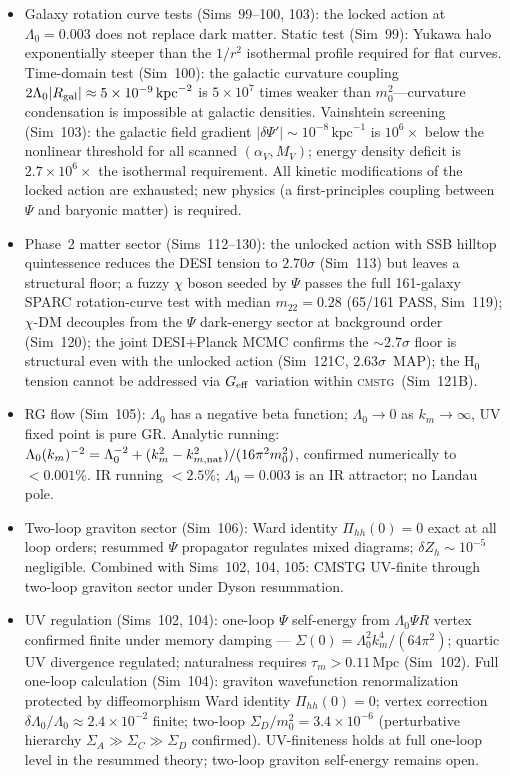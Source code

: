 \documentclass[12pt,a4paper]{article}
\newcommand{\CMSTG}{\textsc{cmstg}}
\begin{document}
\begin{itemize}
  \item Galaxy rotation curve tests (Sims~99--100, 103): the locked action at $\Lambda_0=0.003$ does not replace dark matter.  Static test (Sim~99): Yukawa halo exponentially steeper than the $1/r^2$ isothermal profile required for flat curves.  Time-domain test (Sim~100): the galactic curvature coupling $2\Lambda_0|R_{\rm gal}|\approx5\times10^{-9}\,{\rm kpc}^{-2}$ is $5\times10^7$ times weaker than $m_0^2$---curvature condensation is impossible at galactic densities.  Vainshtein screening (Sim~103): the galactic field gradient $|\delta\Psi'|\sim10^{-8}\,\mathrm{kpc}^{-1}$ is $10^6\times$ below the nonlinear threshold for all scanned $(\alpha_V,M_V)$; energy density deficit is $2.7\times10^6\times$ the isothermal requirement.  All kinetic modifications of the locked action are exhausted; new physics (a first-principles coupling between $\Psi$ and baryonic matter) is required.
  \item Phase~2 matter sector (Sims~112--130): the unlocked action with SSB hilltop quintessence reduces the DESI tension to $2.70\sigma$ (Sim~113) but leaves a structural floor; a fuzzy $\chi$ boson seeded by $\Psi$ passes the full 161-galaxy SPARC rotation-curve test with median $m_{22}=0.28$ (65/161 PASS, Sim~119); $\chi$-DM decouples from the $\Psi$ dark-energy sector at background order (Sim~120); the joint DESI+Planck MCMC confirms the $\sim2.7\sigma$ floor is structural even with the unlocked action (Sim~121C, $2.63\sigma$~MAP); the H$_0$ tension cannot be addressed via $G_{\rm eff}$ variation within \CMSTG\ (Sim~121B).
  \item RG flow (Sim~105): $\Lambda_0$ has a negative beta function; $\Lambda_0\to 0$ as $k_m\to\infty$, UV fixed point is pure GR.  Analytic running: $\Lambda_0(k_m)^{-2} = \Lambda_0^{-2}+(k_m^2-k_{m,\rm nat}^2)/(16\pi^2 m_0^2)$, confirmed numerically to $<0.001\%$.  IR running $<2.5\%$; $\Lambda_0=0.003$ is an IR attractor; no Landau pole.
  \item Two-loop graviton sector (Sim~106): Ward identity $\Pi_{hh}(0)=0$ exact at all loop orders; resummed $\Psi$ propagator regulates mixed diagrams; $\delta Z_h\sim10^{-5}$ negligible. Combined with Sims~102, 104, 105: CMSTG UV-finite through two-loop graviton sector under Dyson resummation.
  \item UV regulation (Sims~102, 104): one-loop $\Psi$ self-energy from $\Lambda_0\Psi R$ vertex confirmed finite under memory damping --- $\Sigma(0) = \Lambda_0^2 k_m^4/(64\pi^2)$; quartic UV divergence regulated; naturalness requires $\tau_m > 0.11\,\mathrm{Mpc}$ (Sim~102).  Full one-loop calculation (Sim~104): graviton wavefunction renormalization protected by diffeomorphism Ward identity $\Pi_{hh}(0)=0$; vertex correction $\delta\Lambda_0/\Lambda_0 \approx 2.4\times10^{-2}$ finite; two-loop $\Sigma_D/m_0^2 = 3.4\times10^{-6}$ (perturbative hierarchy $\Sigma_A \gg \Sigma_C \gg \Sigma_D$ confirmed).  UV-finiteness holds at full one-loop level in the resummed theory; two-loop graviton self-energy remains open.

\end{itemize}
\end{document}
